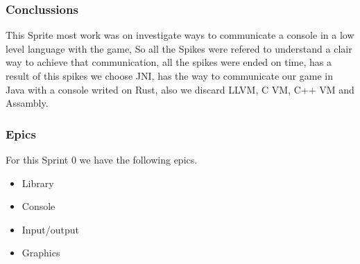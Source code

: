 \documentclass[a4paper,12pt]{article}
\begin{document}
\subsubsection{Conclussions}
This Sprite most work was on investigate ways to communicate a console in a low level language with the game, So all the Spikes were refered to understand a clair way to achieve that communication, all the spikes were ended on time, has a result of this spikes we choose JNI, has the way to communicate our game in Java with a console writed on Rust, also we discard LLVM, C VM, C++ VM and Assambly.

\subsubsection{Epics}
For this Sprint 0 we have the following epics.
\begin{itemize}
    \item Library
    \item Console
    \item Input/output
    \item Graphics
\end{itemize}
\end{document}
